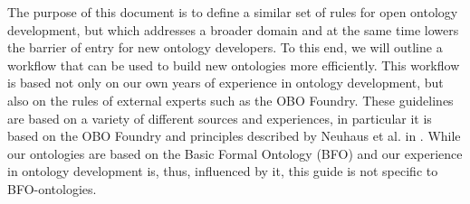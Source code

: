 The purpose of this document is to define a similar set of rules for open ontology development, but which addresses a broader domain and at the same time lowers the barrier of entry for new ontology developers. To this end, we will outline a workflow that can be used to build new ontologies more efficiently. This workflow is based not only on our own years of experience in ontology development, but also on the rules of external experts such as the OBO Foundry. These guidelines are based on a variety of different sources and experiences, in particular it is based on the OBO Foundry \cite{smith2007obo} and principles described by Neuhaus et al. in \cite{Neuhaus2022OntologyDI, neuhaus2018ontology}. While our ontologies are based on the Basic Formal Ontology (BFO) \cite{bfo-book} and our experience in ontology development is, thus, influenced by it, this guide is not specific to BFO-ontologies. 
%
%
%
%
%
%
